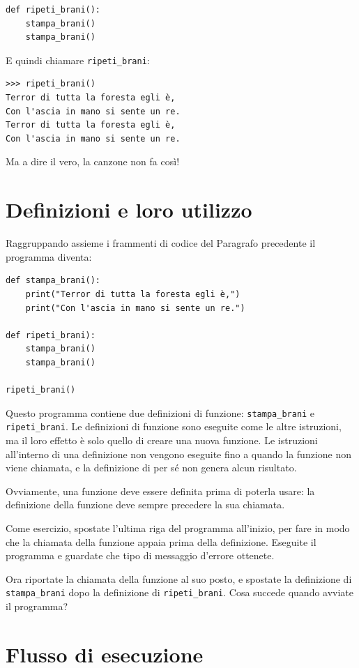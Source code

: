 \documentclass[10pt]{book}
\begin{document}
\begin{verbatim}
def ripeti_brani():
    stampa_brani()
    stampa_brani()
\end{verbatim}
%
E quindi chiamare \verb"ripeti_brani":

\begin{verbatim}
>>> ripeti_brani()
Terror di tutta la foresta egli è,
Con l'ascia in mano si sente un re.
Terror di tutta la foresta egli è,
Con l'ascia in mano si sente un re.
\end{verbatim}
%
Ma a dire il vero, la canzone non fa così!


\section{Definizioni e loro utilizzo}

Raggruppando assieme i frammenti di codice del Paragrafo precedente il programma diventa:

\begin{verbatim}
def stampa_brani():
    print("Terror di tutta la foresta egli è,")
    print("Con l'ascia in mano si sente un re.")

def ripeti_brani):
    stampa_brani()
    stampa_brani()

ripeti_brani()
\end{verbatim}
%
Questo programma contiene due definizioni di funzione: \verb"stampa_brani" e
\verb"ripeti_brani".  Le definizioni di funzione sono eseguite come le altre istruzioni, ma il loro effetto è solo quello di creare una nuova funzione. Le istruzioni all'interno di una definizione non vengono eseguite fino a quando la funzione non viene chiamata, e la definizione di per sé non genera alcun risultato.

Ovviamente, una funzione deve essere definita prima di poterla usare: la definizione della funzione deve sempre precedere la sua chiamata.

Come esercizio, spostate l'ultima riga del programma all'inizio, per fare in modo che la chiamata della funzione appaia prima della definizione. Eseguite il programma e guardate che tipo di messaggio d'errore ottenete.

Ora riportate la chiamata della funzione al suo posto, e spostate la definizione di \verb"stampa_brani" dopo la definizione di \verb"ripeti_brani". Cosa succede quando avviate il programma?


\section{Flusso di esecuzione}
\end{document}
